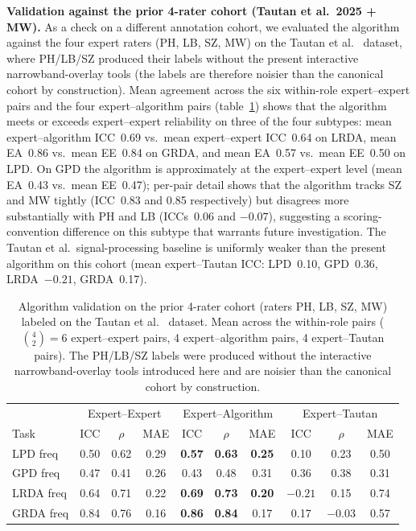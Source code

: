 \documentclass{iopjournal}
\begin{document}
\textbf{Validation against the prior 4-rater cohort (Tautan et al.\ 2025 + MW).}
As a check on a different annotation cohort, we evaluated the algorithm against the four expert raters (PH, LB, SZ, MW) on the Tautan et al.~\cite{tautan2025} dataset, where PH/LB/SZ produced their labels without the present interactive narrowband-overlay tools (the labels are therefore noisier than the canonical cohort by construction). Mean agreement across the six within-role expert--expert pairs and the four expert--algorithm pairs (table~\ref{tab:phlbsz_cohort}) shows that the algorithm meets or exceeds expert--expert reliability on three of the four subtypes: mean expert--algorithm ICC~0.69 vs.\ mean expert--expert ICC~0.64 on LRDA, mean EA~0.86 vs.\ mean EE~0.84 on GRDA, and mean EA~0.57 vs.\ mean EE~0.50 on LPD. On GPD the algorithm is approximately at the expert--expert level (mean EA~0.43 vs.\ mean EE~0.47); per-pair detail shows that the algorithm tracks SZ and MW tightly (ICC~0.83 and 0.85 respectively) but disagrees more substantially with PH and LB (ICCs~0.06 and $-0.07$), suggesting a scoring-convention difference on this subtype that warrants future investigation. The Tautan et al.\ signal-processing baseline is uniformly weaker than the present algorithm on this cohort (mean expert--Tautan ICC: LPD~0.10, GPD~0.36, LRDA~$-0.21$, GRDA~0.17).

\begin{table}[t]
\caption{Algorithm validation on the prior 4-rater cohort (raters PH, LB, SZ, MW) labeled on the Tautan et al.~\cite{tautan2025} dataset. Mean across the within-role pairs ($\binom{4}{2}=6$ expert--expert pairs, 4 expert--algorithm pairs, 4 expert--Tautan pairs). The PH/LB/SZ labels were produced without the interactive narrowband-overlay tools introduced here and are noisier than the canonical cohort by construction.}
\label{tab:phlbsz_cohort}
\centering
\small
\begin{tabular}{l | c c c | c c c | c c c}
\hline
& \multicolumn{3}{c|}{Expert--Expert} & \multicolumn{3}{c|}{Expert--Algorithm} & \multicolumn{3}{c}{Expert--Tautan} \\
Task & ICC & $\rho$ & MAE & ICC & $\rho$ & MAE & ICC & $\rho$ & MAE \\
\hline
LPD freq  & 0.50 & 0.62 & 0.29 & \textbf{0.57} & \textbf{0.63} & \textbf{0.25} &  0.10 & 0.23 & 0.50 \\
GPD freq  & 0.47 & 0.41 & 0.26 & 0.43 & 0.48 & 0.31 &  0.36 & 0.38 & 0.31 \\
LRDA freq & 0.64 & 0.71 & 0.22 & \textbf{0.69} & \textbf{0.73} & \textbf{0.20} & $-0.21$ & 0.15 & 0.74 \\
GRDA freq & 0.84 & 0.76 & 0.16 & \textbf{0.86} & \textbf{0.84} & 0.17 &  0.17 & $-0.03$ & 0.57 \\
\hline
\end{tabular}
\end{table}
\end{document}

